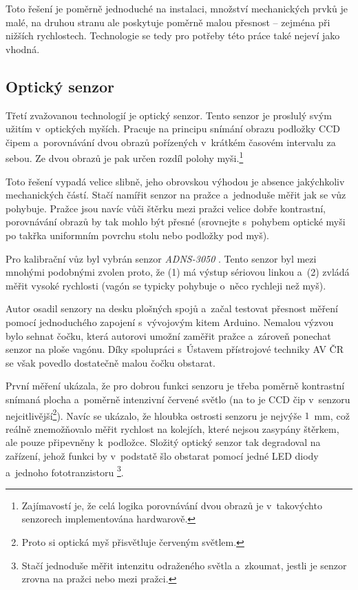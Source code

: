 Toto řešení je poměrně jednoduché na instalaci, množství mechanických prvků je
malé, na druhou stranu ale poskytuje poměrně malou přesnost -- zejména při
nižších rychlostech. Technologie  se tedy pro potřeby této
práce také nejeví jako vhodná.

\subsection{Optický senzor}
\label{subsec:wsm-senzor-opto}

Třetí zvažovanou technologií je optický senzor. Tento senzor je proslulý svým
užitím v~optických myších. Pracuje na principu snímání obrazu podložky CCD
čipem a~porovnávání dvou obrazů pořízených v~krátkém časovém intervalu za
sebou. Ze dvou obrazů je pak určen rozdíl polohy myši.\footnote{Zajímavostí
je, že celá logika porovnávání dvou obrazů je v~takovýchto senzorech
implementována hardwarově.}

Toto řešení vypadá velice slibně, jeho obrovskou výhodou je absence jakýchkoliv
mechanických částí. Stačí namířit senzor na pražce a~jednoduše měřit jak se vůz
pohybuje. Pražce jsou navíc vůči štěrku mezi pražci velice dobře kontrastní,
porovnávání obrazů by tak mohlo být přesné (srovnejte s~pohybem optické
myši po takřka uniformním povrchu stolu nebo podložky pod myš).

Pro kalibrační vůz byl vybrán senzor \textit{ADNS-3050} \cite{adns-3050}.
Tento senzor byl mezi mnohými podobnými zvolen proto, že (1) má výstup sériovou
linkou a~(2) zvládá měřit vysoké rychlosti (vagón se typicky pohybuje o~něco
rychleji než myš).

Autor osadil senzory na desku plošných spojů a~začal testovat přesnost měření
pomocí jednoduchého zapojení s~vývojovým kitem Arduino. Nemalou výzvou bylo
sehnat čočku, která autorovi umožní zaměřit pražce a~zároveň ponechat senzor na
ploše vagónu. Díky spolupráci s~Ústavem přístrojové techniky AV ČR se však
povedlo dostatečně malou čočku obstarat.

První měření ukázala, že pro dobrou funkci senzoru je třeba poměrně kontrastní
snímaná plocha a~poměrně intenzivní červené světlo (na to je CCD čip v~senzoru
nejcitlivější\footnote{Proto si optická myš přisvětluje červeným světlem.}).
Navíc se ukázalo, že hloubka ostrosti senzoru je nejvýše $1$~mm, což reálně
znemožňovalo měřit rychlost na kolejích, které nejsou zasypány štěrkem, ale
pouze připevněny k~podložce. Složitý optický senzor tak degradoval na zařízení,
jehož funkci by v~podstatě šlo obstarat pomocí jedné LED diody a~jednoho
fototranzistoru \footnote{Stačí jednoduše měřit intenzitu odraženého světla
a~zkoumat, jestli je senzor zrovna na pražci nebo mezi pražci.}.

